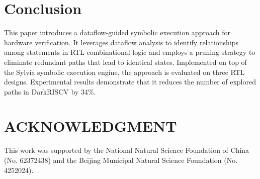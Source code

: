 \documentclass[conference]{IEEEtran}
\begin{document}
\section{Conclusion}
\label{sec:conclusion}
This paper introduces a dataflow-guided symbolic execution approach for hardware verification. It leverages dataflow analysis to identify relationships among statements in RTL combinational logic and employs a pruning strategy to eliminate redundant paths that lead to identical states. Implemented on top of the Sylvia symbolic execution engine, the approach is evaluated on three RTL designs. Experimental results demonstrate that it reduces the number of explored paths in DarkRISCV by 34\%.
\vspace{-5pt}
\section{ACKNOWLEDGMENT}
\label{sec:ack}
This work was supported by the National Natural Science Foundation of China (No. 62372438) and the Beijing Municipal Natural Science Foundation (No. 4252024).





\end{document}
